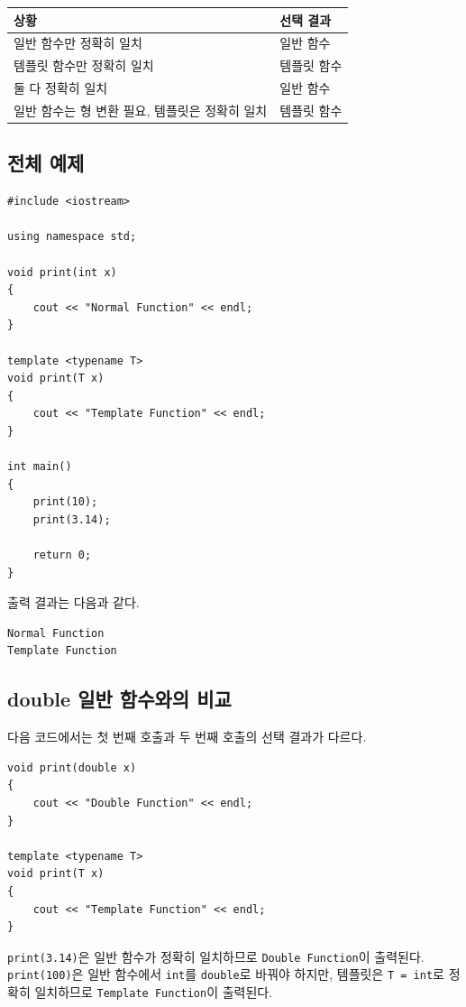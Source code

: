 \documentclass[11pt,a4paper]{article}
\begin{document}
\begin{center}
\begin{tabular}{ll}
\toprule
상황 & 선택 결과 \\
\midrule
일반 함수만 정확히 일치 & 일반 함수 \\
템플릿 함수만 정확히 일치 & 템플릿 함수 \\
둘 다 정확히 일치 & 일반 함수 \\
일반 함수는 형 변환 필요, 템플릿은 정확히 일치 & 템플릿 함수 \\
\bottomrule
\end{tabular}
\end{center}

\subsection{전체 예제}
\begin{lstlisting}
#include <iostream>

using namespace std;

void print(int x)
{
    cout << "Normal Function" << endl;
}

template <typename T>
void print(T x)
{
    cout << "Template Function" << endl;
}

int main()
{
    print(10);
    print(3.14);

    return 0;
}
\end{lstlisting}

출력 결과는 다음과 같다.

\begin{verbatim}
Normal Function
Template Function
\end{verbatim}

\subsection{double 일반 함수와의 비교}
다음 코드에서는 첫 번째 호출과 두 번째 호출의 선택 결과가 다르다.

\begin{lstlisting}
void print(double x)
{
    cout << "Double Function" << endl;
}

template <typename T>
void print(T x)
{
    cout << "Template Function" << endl;
}
\end{lstlisting}

\texttt{print(3.14)}은 일반 함수가 정확히 일치하므로 \texttt{Double Function}이 출력된다. \texttt{print(100)}은 일반 함수에서 \texttt{int}를 \texttt{double}로 바꿔야 하지만, 템플릿은 \texttt{T = int}로 정확히 일치하므로 \texttt{Template Function}이 출력된다.
\end{document}
